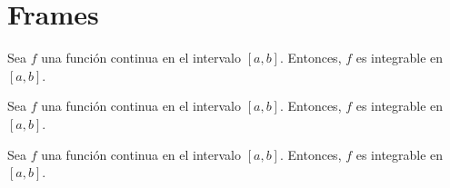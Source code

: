 \documentclass{article}
\begin{document}
\section*{Frames}
\begin{theorem}{1.1}
    Sea $f$ una función continua en el intervalo $[a, b]$. Entonces, $f$ es integrable en $[a, b]$.
\end{theorem}

\begin{problem}{1.2}
    Sea $f$ una función continua en el intervalo $[a, b]$. Entonces, $f$ es integrable en $[a, b]$.
\end{problem}

\begin{remark}
    Sea $f$ una función continua en el intervalo $[a, b]$. Entonces, $f$ es integrable en $[a, b]$.
\end{remark}
\end{document}
